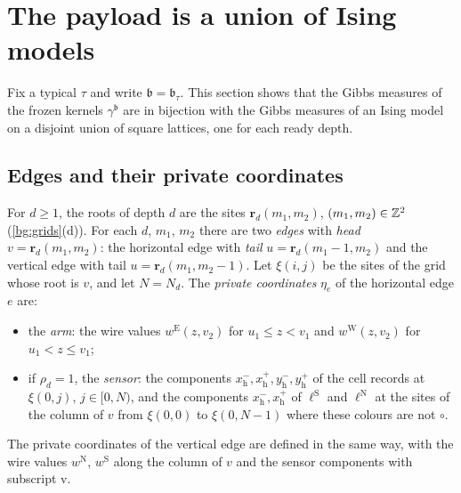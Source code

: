 \section{The payload is a union of Ising models}\label{sec:payload}

Fix a typical $\tau$ and write $\mathfrak b=\mathfrak b_\tau$. This section shows that the Gibbs measures of the frozen kernels $\gamma^{\mathfrak b}$ are in bijection with the Gibbs measures of an Ising model on a disjoint union of square lattices, one for each ready depth.

\subsection{Edges and their private coordinates}

For $d\ge1$, the roots of depth $d$ are the sites $\mathbf r_d(m_1,m_2)$, $(m_1,m_2)\in\mathbb{Z}^2$ (\cref{bg:grids}(d)). For each $d$, $m_1$, $m_2$ there are two \emph{edges} with \emph{head} $v=\mathbf r_d(m_1,m_2)$: the horizontal edge with \emph{tail} $u=\mathbf r_d(m_1-1,m_2)$ and the vertical edge with tail $u=\mathbf r_d(m_1,m_2-1)$. Let $\xi(i,j)$ be the sites of the grid whose root is $v$, and let $N=N_d$. The \emph{private coordinates} $\eta_e$ of the horizontal edge $e$ are:
\begin{itemize}
\item the \emph{arm}: the wire values $w^{\mathrm E}(z,v_2)$ for $u_1\le z<v_1$ and $w^{\mathrm W}(z,v_2)$ for $u_1<z\le v_1$;
\item if $\rho_d=1$, the \emph{sensor}: the components $x^-_{\mathrm h},x^+_{\mathrm h},y^-_{\mathrm h},y^+_{\mathrm h}$ of the cell records at $\xi(0,j)$, $j\in[0,N)$, and the components $x^-_{\mathrm h},x^+_{\mathrm h}$ of $\ell^{\mathrm S}$ and $\ell^{\mathrm N}$ at the sites of the column of $v$ from $\xi(0,0)$ to $\xi(0,N-1)$ where these colours are not $\circ$.
\end{itemize}
The private coordinates of the vertical edge are defined in the same way, with the wire values $w^{\mathrm N}$, $w^{\mathrm S}$ along the column of $v$ and the sensor components with subscript $\mathrm v$.

